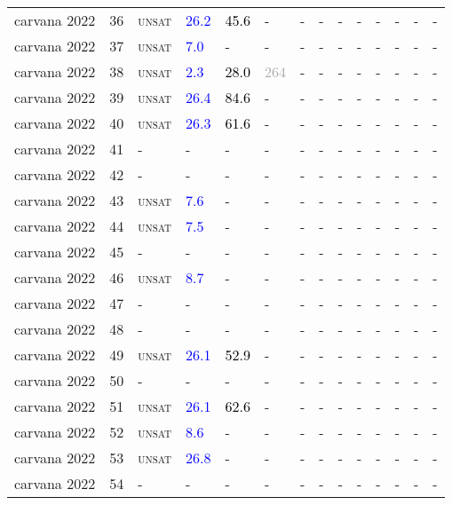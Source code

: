\begin{center}
{\begin{longtable}{@{}llllllllllllll@{}}
carvana 2022 & 36 & \textsc{unsat} & \textcolor{blue}{26.2} & \textcolor{black}{45.6} & - & - & - & - & - & - & - & - & - \\
carvana 2022 & 37 & \textsc{unsat} & \textcolor{blue}{7.0} & - & - & - & - & - & - & - & - & - & - \\
carvana 2022 & 38 & \textsc{unsat} & \textcolor{blue}{2.3} & \textcolor{black}{28.0} & \textcolor{darkgray}{264} & - & - & - & - & - & - & - & - \\
carvana 2022 & 39 & \textsc{unsat} & \textcolor{blue}{26.4} & \textcolor{black}{84.6} & - & - & - & - & - & - & - & - & - \\
carvana 2022 & 40 & \textsc{unsat} & \textcolor{blue}{26.3} & \textcolor{black}{61.6} & - & - & - & - & - & - & - & - & - \\
carvana 2022 & 41 & - & - & - & - & - & - & - & - & - & - & - & - \\
carvana 2022 & 42 & - & - & - & - & - & - & - & - & - & - & - & - \\
carvana 2022 & 43 & \textsc{unsat} & \textcolor{blue}{7.6} & - & - & - & - & - & - & - & - & - & - \\
carvana 2022 & 44 & \textsc{unsat} & \textcolor{blue}{7.5} & - & - & - & - & - & - & - & - & - & - \\
carvana 2022 & 45 & - & - & - & - & - & - & - & - & - & - & - & - \\
carvana 2022 & 46 & \textsc{unsat} & \textcolor{blue}{8.7} & - & - & - & - & - & - & - & - & - & - \\
carvana 2022 & 47 & - & - & - & - & - & - & - & - & - & - & - & - \\
carvana 2022 & 48 & - & - & - & - & - & - & - & - & - & - & - & - \\
carvana 2022 & 49 & \textsc{unsat} & \textcolor{blue}{26.1} & \textcolor{black}{52.9} & - & - & - & - & - & - & - & - & - \\
carvana 2022 & 50 & - & - & - & - & - & - & - & - & - & - & - & - \\
carvana 2022 & 51 & \textsc{unsat} & \textcolor{blue}{26.1} & \textcolor{black}{62.6} & - & - & - & - & - & - & - & - & - \\
carvana 2022 & 52 & \textsc{unsat} & \textcolor{blue}{8.6} & - & - & - & - & - & - & - & - & - & - \\
carvana 2022 & 53 & \textsc{unsat} & \textcolor{blue}{26.8} & - & - & - & - & - & - & - & - & - & - \\
carvana 2022 & 54 & - & - & - & - & - & - & - & - & - & - & - & - \\

\end{longtable}}
\end{center}
